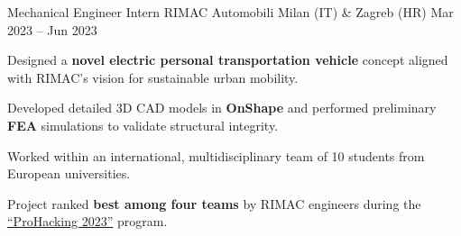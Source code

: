 
\cventry
{Mechanical Engineer Intern}
{RIMAC Automobili}
{Milan (IT) \& Zagreb (HR)}
{Mar 2023 -- Jun 2023}
{
    \begin{cvitems}
        \item {Designed a \textbf{novel electric personal transportation vehicle} concept aligned with RIMAC's vision for sustainable urban mobility.}
        \item {Developed detailed 3D CAD models in \textbf{OnShape} and performed preliminary \textbf{FEA} simulations to validate structural integrity.}
        \item {Worked within an international, multidisciplinary team of 10 students from European universities.}
        \item {Project ranked \textbf{best among four teams} by RIMAC engineers during the \href{https://prohackin.eu/2023/05/16/conceptual-design-hackathon-held-at-rimac/}{``ProHacking 2023''} program.}
    \end{cvitems}
}


